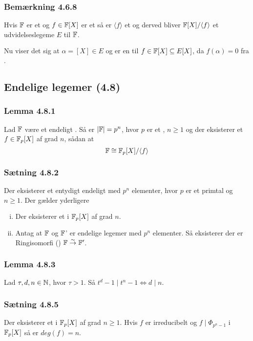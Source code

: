 \subsubsection{Bemærkning 4.6.8}
\label{Bemaerkning 4.6.8}
Hvis $\mathbb{F}$ er et  og $f\in \mathbb{F}[X]$ er et  så er $\langle f \rangle$ et  og derved bliver
$\mathbb{F}[X]/\langle f \rangle$ et udvidelseslegeme $E$ til $\mathbb{F}$.

Nu viser det sig at $\alpha = [X] \in E$ og er en  til $f \in
\mathbb{F}[X] \subseteq E[X]$, da $f(\alpha) = 0$ fra .

\subsection{Endelige legemer (4.8)}
\label{Endelige legemer (4.8)}
\subsubsection{Lemma 4.8.1}
\label{Lemma 4.8.1}
Lad $\mathbb{F}$ være et endeligt . Så er $|\mathbb{F}| = p^n$, hvor $p$ er et
, $n \geq 1$ og der eksisterer et  $f \in \mathbb{F}_{p}[X]$ af grad $n$, sådan at
\begin{equation*}
  \mathbb{F} \cong \mathbb{F}_p[X]/\langle f \rangle
\end{equation*}

\subsubsection{Sætning 4.8.2}
\label{Saetning 4.8.2}
Der eksisterer et entydigt endeligt  med $p^n$ elementer, hvor
$p$ er et primtal og $n \geq 1$. Der gælder yderligere
\begin{enumerate}[(i)]
  \item Der eksisterer et  i $\mathbb{F}_p [X]$ af grad
  $n$.
  \item Antag at $\mathbb{F}$ og $\mathbb{F}$' er endelige legemer med $p^n$ elementer. Så
  eksisterer der er Ringisomorfi () $\mathbb{F} \overset{\sim}{\rightarrow}
  \mathbb{F}'$.
\end{enumerate}

\subsubsection{Lemma 4.8.3}
\label{Lemma 4.8.3}
Lad $\tau, d, n \in \mathbb{N}$, hvor $\tau > 1$. Så $t^d - 1 \mid t^n -1 \iff d \mid
n$.

\subsubsection{Sætning 4.8.5}
\label{Saetning 4.8.5}
Der eksisterer et  i $\mathbb{F}_p [X]$ af grad $n \geq
1$. Hvis $f$ er irreducibelt og $f \mid \Phi_{p^n - 1}$ i $\mathbb{F}_p [X]$ så er
$deg(f) = n$.